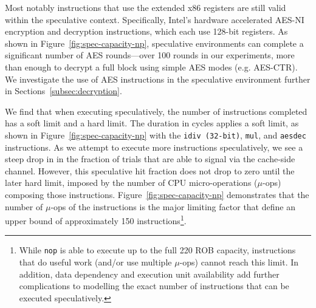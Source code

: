 % 

Most notably instructions that use the extended x86 registers are still valid
within the speculative context. Specifically, Intel's hardware accelerated
AES-NI encryption and decryption instructions, which each use 128-bit registers.
As shown in Figure~\ref{fig:spec-capacity-np}, speculative environments can
complete a significant number of AES rounds---over 100 rounds in our
experiments, more than enough to decrypt a
full block using simple AES modes (e.g. AES-CTR). We investigate the use of AES
instructions in the speculative environment further in
Sections~\ref{subsec:decryption}.


We find that when executing speculatively, the number of instructions completed
has a soft limit and a hard limit. The duration in cycles applies a soft limit,
as shown in Figure~\ref{fig:spec-capacity-np} with the \texttt{idiv (32-bit)},
\texttt{mul}, and \texttt{aesdec} instructions. As we attempt to execute more
instructions speculatively, we see a steep drop in in the fraction
of trials that are able to signal via the cache-side channel. However, this speculative
hit fraction does not drop to zero until the later hard limit,
imposed by the number of CPU micro-operations ($\mu$-ops) composing those instructions.
Figure~\ref{fig:spec-capacity-np} demonstrates that
the number of $\mu$-ops of the instructions is the major limiting factor that
define an upper bound of approximately 150 instructions\footnote{While
\texttt{nop} is able to execute up to the full 220 ROB capacity, instructions
that do useful work (and/or use multiple $\mu$-ops) cannot reach this limit.
In addition, data dependency and execution unit availability add further
complications to modelling the exact number of instructions that can be executed
speculatively.}.




